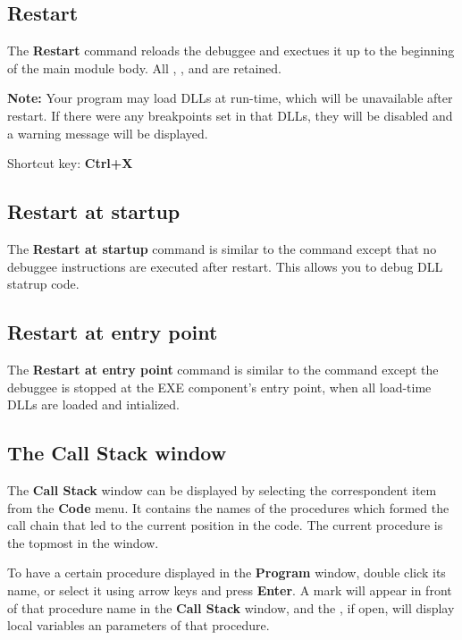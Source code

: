 \subsection{Restart}
\label{dialog:executing:restart}

The {\bf Restart} command reloads the debuggee and exectues it up to 
the beginning of the main module body. All
, ,
and  are retained.

{\bf Note:} Your program may load DLLs at run-time, which will
be unavailable after restart. If there were any breakpoints
set in that DLLs, they will be disabled and a warning
message will be displayed.

Shortcut key: {\bf Ctrl+X}

\subsection{Restart at startup}
\label{dialog:executing:startup}

The {\bf Restart at startup} command is similar to the
 command
except that no debuggee instructions are executed after restart.
This allows you to debug DLL statrup code.

\subsection{Restart at entry point}
\label{dialog:executing:entry}


The {\bf Restart at entry point} command is similar to the
 command
except the debuggee is stopped at the EXE component's entry point, 
when all load-time DLLs are loaded and intialized.

\subsection{The Call Stack window}
\label{dialog:executing:callstack}

The {\bf Call Stack} window can be displayed by selecting the
correspondent item from the {\bf Code} menu. It contains the names
of the procedures which formed the call chain that led to the current
position in the code. The current procedure is the topmost in the window.

To have a certain procedure displayed in the {\bf Program} window,
double click its name, or select it using arrow keys and press {\bf Enter}.
A mark will appear in front of that procedure name in the {\bf Call Stack} 
window, and the , 
if open, will display local variables an parameters of that procedure.

